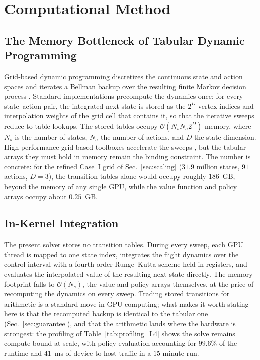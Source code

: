 \documentclass[journal ]{new-aiaa}
\begin{document}
\section{Computational Method}
\subsection{The Memory Bottleneck of Tabular Dynamic Programming}
Grid-based dynamic programming discretizes the continuous state and action spaces and iterates a Bellman backup over the resulting finite Markov decision process \cite{Bellman1957, Bertsekas2017}. Standard implementations precompute the dynamics once: for every state--action pair, the integrated next state is stored as the $2^D$ vertex indices and interpolation weights of the grid cell that contains it, so that the iterative sweeps reduce to table lookups. The stored tables occupy $\mathcal{O}(N_s N_a 2^D)$ memory, where $N_s$ is the number of states, $N_a$ the number of actions, and $D$ the state dimension. High-performance grid-based toolboxes accelerate the sweeps \cite{Bui2022}, but the tabular arrays they must hold in memory remain the binding constraint. The number is concrete: for the refined Case~I grid of Sec.~\ref{sec:scaling} ($31.9$ million states, $91$ actions, $D=3$), the transition tables alone would occupy roughly $186$~GB, beyond the memory of any single GPU, while the value function and policy arrays occupy about $0.25$~GB.

\subsection{In-Kernel Integration}
The present solver stores no transition tables. During every sweep, each GPU thread is mapped to one state index, integrates the flight dynamics over the control interval with a fourth-order Runge--Kutta scheme held in registers, and evaluates the interpolated value of the resulting next state directly. The memory footprint falls to $\mathcal{O}(N_s)$, the value and policy arrays themselves, at the price of recomputing the dynamics on every sweep. Trading stored transitions for arithmetic is a standard move in GPU computing; what makes it worth stating here is that the recomputed backup is identical to the tabular one (Sec.~\ref{sec:guarantee}), and that the arithmetic lands where the hardware is strongest: the profiling of Table~\ref{tab:profiling_L4} shows the solve remains compute-bound at scale, with policy evaluation accounting for $99.6\%$ of the runtime and $41$~ms of device-to-host traffic in a $15$-minute run.
\end{document}
